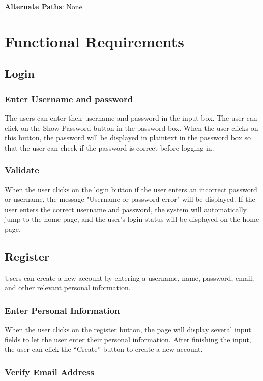 \documentclass[conference]{IEEEtran}
\begin{document}
\textbf{Alternate Paths}: None

\section{Functional Requirements}


\subsection{ Login}

\subsubsection{ Enter Username and password}

The users can enter their username and password in the input box. The 
user can click on the Show Password button in the password box. When the user 
clicks on this button, the password will be displayed in plaintext in the password 
box so that the user can check if the password is correct before logging in.

\subsubsection{ Validate}

When the user clicks on the login button if the user enters an incorrect 
password or username, the message "Username or password error" will be 
displayed. If the user enters the correct username and password, the system 
will automatically jump to the home page, and the user's login status will be 
displayed on the home page.


\subsection{  Register}
Users can create a new account by entering a username, name, password, email,
and other relevant personal information.

\subsubsection{ Enter Personal Information}
When the user clicks on the register button, the page will display several 
input fields to let the user enter their personal information. After finishing the 
input, the user can click the “Create” button to create a new account.

\subsubsection{ Verify Email Address }
\end{document}
